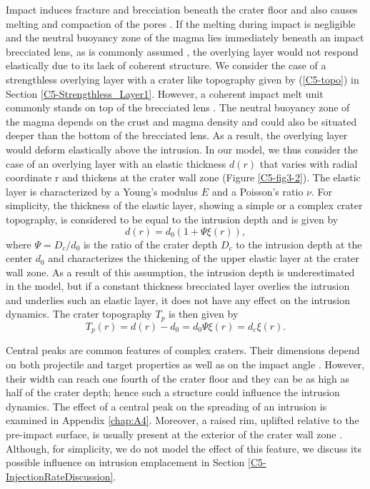Impact  induces  fracture and  brecciation  beneath  the crater  floor
\citep{Wilhelms:1987vb,Melosh:1989jl,Jolliff:2000vf}  and also  causes
melting        and        compaction        of        the        pores
\citep{Melosh:1989jl,Schultz:1976kt}.  If the melting during impact is
negligible and the neutral buoyancy zone of the magma lies immediately
beneath   an  impact   brecciated   lens,  as   is  commonly   assumed
\citep{Schultz:1976kt,Wichman:1996bj,Jozwiak:2012dq},   the  overlying
layer  would not  respond  elastically  due to  its  lack of  coherent
structure. We consider the case of a strengthless overlying layer with
a  crater   like  topography  given  by   (\ref{C5-topo})  in  Section
\ref{C5-Strengthless_Layer1}.   However, a  coherent impact  melt unit
commonly     stands    on     top    of     the    brecciated     lens
\citep{Melosh:1989jl,Schultz:1976kt}.   The neutral  buoyancy zone  of
the magma  depends on the  crust and magma  density and could  also be
situated deeper than the bottom of  the brecciated lens.  As a result,
the overlying layer would deform  elastically above the intrusion.  In
our model,  we thus consider  the case of  an overlying layer  with an
elastic thickness  $d(r)$ that varies  with radial coordinate  r and
thickens  at  the  crater  wall zone  (Figure  \ref{C5-fig3-2}).   The
elastic  layer  is  characterized  by  a Young's  modulus  $E$  and  a
Poisson's ratio $\nu$.   For simplicity, the thickness  of the elastic
layer, showing a simple or  a complex crater topography, is considered
to be equal to the intrusion depth and is given by
\begin{equation}
  d(r)=d_0(1+\Psi \xi(r)),
  \label{C5-3-2}
\end{equation}	
where $\Psi=D_{c}/d_0$ is the ratio of the crater depth $D_{c}$ to
the  intrusion depth  at the  center $d_0$  and characterizes  the
thickening of the  upper elastic layer at the crater  wall zone.  As a
result of  this assumption, the  intrusion depth is  underestimated in
the model, but  if a constant thickness brecciated  layer overlies the
intrusion and  underlies such an elastic  layer, it does not  have any
effect on the intrusion dynamics.  The crater topography $T_p$ is then
given by
\begin{equation}
  T_p(r)=d(r)-d_0=d_0\Psi\xi(r)=d_c\xi(r).
  \label{C5-topo1}
\end{equation}
	 
Central  peaks   are  common  features  of   complex  craters.   Their
dimensions depend on both projectile  and target properties as well as
on  the  impact  angle  \citep{Schultz:1994cv,Bray:2008fu}.   However,
their width can reach  one fourth of the crater floor  and they can be
as high  as half  of the  crater depth; hence  such a  structure could
influence the intrusion dynamics.  The effect of a central peak on the
spreading  of  an intrusion  is  examined  in Appendix  \ref{chap:A4}.
Moreover, a raised  rim, uplifted relative to  the pre-impact surface,
is  usually  present   at  the  exterior  of  the   crater  wall  zone
\citep{Pike:1976ei,Pike:1980eh}. Although,  for simplicity, we  do not
model the effect of this feature, we discuss its possible influence on
intrusion emplacement in Section \ref{C5-InjectionRateDiscussion}.
	 		 

